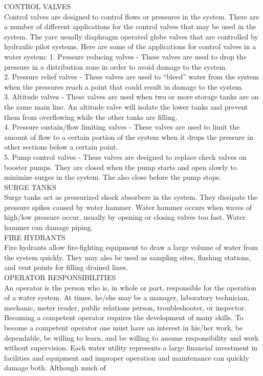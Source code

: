 \documentclass{article}
\begin{document}
CONTROL VALVES\\
Control valves are designed to control flows or pressures in the system. There are a number of different applications for the control valves that may be used in the system. The yare usually diaphragm operated globe valves that are controlled by hydraulic pilot systems. Here are some of the applications for control valves in a water system:
1. Pressure reducing valves - These valves are used to drop the pressure in a distribution zone in order to avoid damage to the system.\\
2. Pressure relief valves - These valves are used to “bleed” water from the system when the pressures reach a point that could result in damage to the system.\\
3. Altitude valves - These valves are used when two or more storage tanks are on the same main line. An altitude valve will isolate the lower tanks and prevent them from overflowing while the other tanks are filling.\\
4. Pressure sustain/flow limiting valves - These valves are used to limit the amount of flow to a certain portion of the system when it drops the pressure in other sections below a certain point.\\
5. Pump control valves - These valves are designed to replace check valves on booster pumps. They are closed when the pump starts and open slowly to minimize surges in the system. The also close before the pump stops.\\
SURGE TANKS\\
Surge tanks act as pressurized shock absorbers in the system. They dissipate the pressure spikes caused by water hammer. Water hammer occurs when waves of high/low pressure occur, usually by opening or closing valves too fast. Water hammer can damage piping.\\
FIRE HYDRANTS\\
Fire hydrants allow fire-fighting equipment to draw a large volume of water from the system quickly. They may also be used as sampling sites, flushing stations, and vent points for filling drained lines.\\
OPERATOR RESPONSIBILITIES\\
An operator is the person who is, in whole or part, responsible for the operation of a water system. At times, he/she may be a manager, laboratory technician, mechanic, meter reader, public relations person, troubleshooter, or inspector. Becoming a competent operator requires the development of many skills. To become a competent operator one must have an interest in his/her work, be dependable, be willing to learn, and be willing to assume responsibility and work without supervision. Each water utility represents a large financial investment in facilities and equipment and improper operation and maintenance can quickly damage both. Although much of
\end{document}
